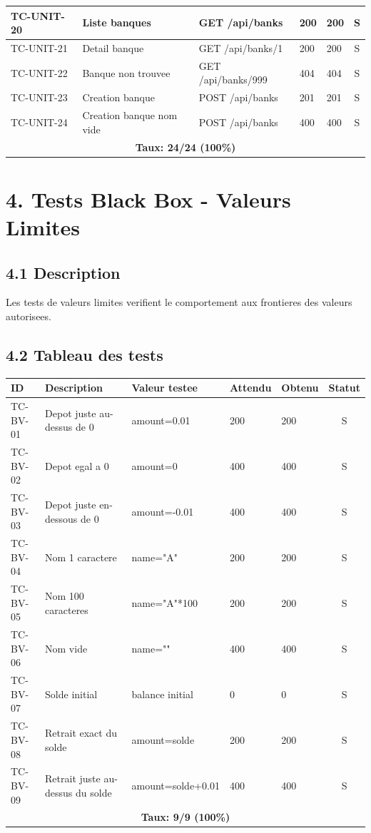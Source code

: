 \documentclass[12pt,a4paper]{article}
\begin{document}
\begin{longtable}{|p{2.2cm}|p{4cm}|p{3.5cm}|p{2.5cm}|p{2.5cm}|c|}
\hline
TC-UNIT-20 & Liste banques & GET /api/banks & 200 & 200 & S \\
\hline
TC-UNIT-21 & Detail banque & GET /api/banks/1 & 200 & 200 & S \\
\hline
TC-UNIT-22 & Banque non trouvee & GET /api/banks/999 & 404 & 404 & S \\
\hline
TC-UNIT-23 & Creation banque & POST /api/banks & 201 & 201 & S \\
\hline
TC-UNIT-24 & Creation banque nom vide & POST /api/banks & 400 & 400 & S \\
\hline
\multicolumn{6}{|c|}{\textbf{Taux: 24/24 (100\%)}} \\
\hline
\end{longtable}

\newpage

\section*{4. Tests Black Box - Valeurs Limites}

\subsection*{4.1 Description}
Les tests de valeurs limites verifient le comportement aux frontieres des valeurs autorisees.

\subsection*{4.2 Tableau des tests}

\begin{longtable}{|p{2.5cm}|p{4cm}|p{4cm}|p{2.5cm}|p{2.5cm}|c|}
\hline
\rowcolor[gray]{0.9}
\textbf{ID} & \textbf{Description} & \textbf{Valeur testee} & \textbf{Attendu} & \textbf{Obtenu} & \textbf{Statut} \\
\hline
TC-BV-01 & Depot juste au-dessus de 0 & amount=0.01 & 200 & 200 & S \\
\hline
TC-BV-02 & Depot egal a 0 & amount=0 & 400 & 400 & S \\
\hline
TC-BV-03 & Depot juste en-dessous de 0 & amount=-0.01 & 400 & 400 & S \\
\hline
TC-BV-04 & Nom 1 caractere & name="A" & 200 & 200 & S \\
\hline
TC-BV-05 & Nom 100 caracteres & name="A"*100 & 200 & 200 & S \\
\hline
TC-BV-06 & Nom vide & name="" & 400 & 400 & S \\
\hline
TC-BV-07 & Solde initial & balance initial & 0 & 0 & S \\
\hline
TC-BV-08 & Retrait exact du solde & amount=solde & 200 & 200 & S \\
\hline
TC-BV-09 & Retrait juste au-dessus du solde & amount=solde+0.01 & 400 & 400 & S \\
\hline
\multicolumn{6}{|c|}{\textbf{Taux: 9/9 (100\%)}} \\
\hline
\end{longtable}
\end{document}
